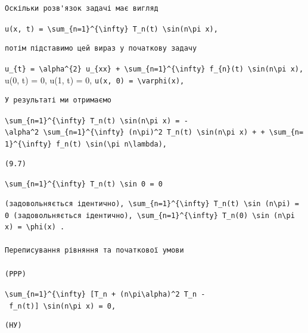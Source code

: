 \documentclass[
  ukrainian,
]{article}
\begin{document}
\begin{verbatim}
Оскільки розв'язок задачі має вигляд
\end{verbatim}

\texttt{u(x,\ t)\ =\ \textbackslash{}sum\_\{n=1\}\^{}\{\textbackslash{}infty\}\ T\_n(t)\ \textbackslash{}sin(n\textbackslash{}pi\ x),}

\begin{verbatim}
потім підставимо цей вираз у початкову задачу
\end{verbatim}

\texttt{u\_\{t\}\ =\ \textbackslash{}alpha\^{}\{2\}\ u\_\{xx\}\ +\ \textbackslash{}sum\_\{n=1\}\^{}\{\textbackslash{}infty\}\ f\_\{n\}(t)\ \textbackslash{}sin(n\textbackslash{}pi\ x),}
u(0, t) = 0, u(1, t) = 0,
\texttt{u(x,\ 0)\ =\ \textbackslash{}varphi(x),}

\begin{verbatim}
У результаті ми отримаємо
\end{verbatim}

\texttt{\textbackslash{}sum\_\{n=1\}\^{}\{\textbackslash{}infty\}\ T\textquotesingle{}\_n(t)\ \textbackslash{}sin(n\textbackslash{}pi\ x)\ =\ -\textbackslash{}alpha\^{}2\ \textbackslash{}sum\_\{n=1\}\^{}\{\textbackslash{}infty\}\ (n\textbackslash{}pi)\^{}2\ T\_n(t)\ \textbackslash{}sin(n\textbackslash{}pi\ x)\ +\ +\ \textbackslash{}sum\_\{n=1\}\^{}\{\textbackslash{}infty\}\ f\_n(t)\ \textbackslash{}sin(\textbackslash{}pi\ n\textbackslash{}lambda),}

\begin{verbatim}
(9.7)
\end{verbatim}

\texttt{\textbackslash{}sum\_\{n=1\}\^{}\{\textbackslash{}infty\}\ T\_n(t)\ \textbackslash{}sin\ 0\ =\ 0}

\begin{verbatim}
(задовольняється ідентично), \sum_{n=1}^{\infty} T_n(t) \sin (n\pi) = 0 (задовольняється ідентично), \sum_{n=1}^{\infty} T_n(0) \sin (n\pi x) = \phi(x) .

Переписування рівняння та початкової умови

(PPP)
\end{verbatim}

\texttt{\textbackslash{}sum\_\{n=1\}\^{}\{\textbackslash{}infty\}\ {[}T\textquotesingle{}\_n\ +\ (n\textbackslash{}pi\textbackslash{}alpha)\^{}2\ T\_n\ -\ f\_n(t){]}\ \textbackslash{}sin(n\textbackslash{}pi\ x)\ =\ 0,}

\begin{verbatim}
(НУ)
\end{verbatim}
\end{document}
